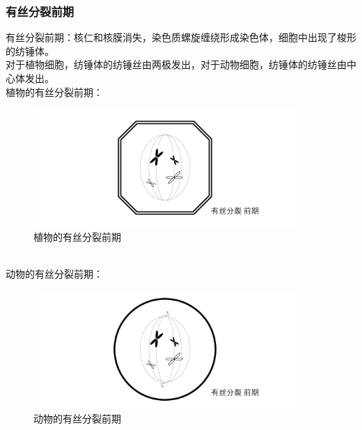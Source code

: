 \documentclass[UTF8]{ctexart}
\begin{document}
\subsubsection{有丝分裂前期}
    有丝分裂前期：核仁和核膜消失，染色质螺旋缠绕形成染色体，细胞中出现了梭形的纺锤体。\\[3mm]
    对于植物细胞，纺锤体的纺锤丝由两极发出，对于动物细胞，纺锤体的纺锤丝由中心体发出。\\[6mm]
    植物的有丝分裂前期：
    \begin{figure}[h]
        \begin{center}
            \includegraphics[width=10cm]{BiologyImage/25.jpg}
            \caption{植物的有丝分裂前期}
        \end{center}
    \end{figure}\\
    动物的有丝分裂前期：
    \begin{figure}[h]
        \begin{center}
            \includegraphics[width=10cm]{BiologyImage/30.jpg}
            \caption{动物的有丝分裂前期}
        \end{center}
    \end{figure}\\

\newpage
\end{document}
